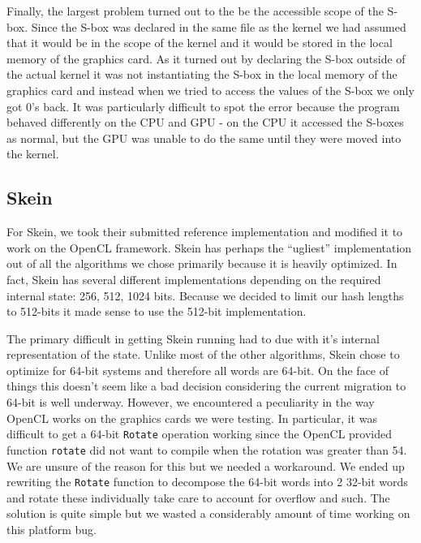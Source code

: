 Finally, the largest problem turned out to the be the accessible scope of the S-box.
Since the S-box was declared in the same file as the kernel we had assumed that it would be in the scope of the kernel and it would be stored in the local memory of the graphics card.
As it turned out by declaring the S-box outside of the actual kernel it was not instantiating the S-box in the local memory of the graphics card and instead when we tried to access the values of the S-box we only got 0's back.
It was particularly difficult to spot the error because the program behaved differently on the CPU and GPU - on the CPU it accessed the S-boxes as normal, but the GPU was unable to do the same until they were moved into the kernel.

\subsection*{Skein}

For Skein, we took their submitted reference implementation and modified it to work on the OpenCL framework.
Skein has perhaps the ``ugliest'' implementation out of all the algorithms we chose primarily because it is heavily optimized.
In fact, Skein has several different implementations depending on the required internal state: 256, 512, 1024 bits.
Because we decided to limit our hash lengths to 512-bits it made sense to use the 512-bit implementation.

The primary difficult in getting Skein running had to due with it's internal representation of the state.
Unlike most of the other algorithms, Skein chose to optimize for 64-bit systems and therefore all words are 64-bit.
On the face of things this doesn't seem like a bad decision considering the current migration to 64-bit is well underway.
However, we encountered a peculiarity in the way OpenCL works on the graphics cards we were testing.
In particular, it was difficult to get a 64-bit {\tt Rotate} operation working since the OpenCL provided function {\tt rotate} did not want to compile when the rotation was greater than 54.
We are unsure of the reason for this but we needed a workaround.
We ended up rewriting the {\tt Rotate} function to decompose the 64-bit words into 2 32-bit words and rotate these individually take care to account for overflow and such.
The solution is quite simple but we wasted a considerably amount of time working on this platform bug.
